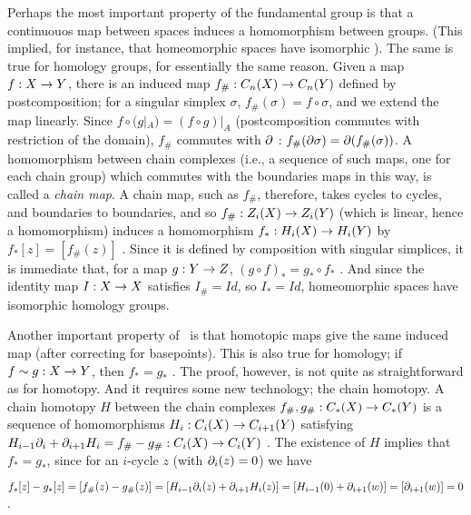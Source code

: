 Perhaps the most important property of the fundamental group is that a continuouos map 
between spaces induces a homomorphism between groups. (This implied, for instance,
that homeomorphic spaces have isomorphic \mpu ). The same is true for homology groups, 
for essentially the same reason. Given a map $f:X\rightarrow Y$, there is an induced map $f_\#:C_n(X)\rightarrow C_n(Y)$
defined by postcomposition; for a singular simplex $\sigma$, $f_\#(\sigma) = f\circ\sigma$, and we extend
the map linearly. Since $f\circ(g|_A) = (f\circ g)|_A$ (postcomposition commutes with restriction of the domain),
$f_\#$ commutes with $\partial$ : $f_\#(\partial \sigma) = \partial(f_\#(\sigma))$. A homomorphism between
chain complexes (i.e., a sequence of such maps, one for each chain group) which commutes with the 
boundaries maps in this way, is called a {\it chain map}.
A chain map, such as $f_\#$, therefore, takes cycles to cycles,
and boundaries to boundaries, and so $f_\#:Z_i(X)\rightarrow Z_i(Y)$ (which is linear, hence a homomorphism)
induces a homomorphism $f_*:H_i(X)\rightarrow H_i(Y)$ by $f_*[z] = [f_\#(z)]$ . 
Since it is defined by composition with singular simplices, it is 
immediate that, for a map $g:Y\rightarrow Z$, $(g\circ f)_*=g_*\circ f_*$ . And since the identity map $I:X\rightarrow X$
satisfies $I_\#=Id$, so $I_*=Id$, homeomorphic spaces have isomorphic homology groups.

\msk

Another important property of \mpu\ is that homotopic maps give the same
induced map (after correcting for basepoints). This is also true for homology;
if $f\sim g:X\rightarrow Y$, then $f_*=g_*$ . The proof, however, is not quite as straightforward
as for homotopy. And it requires some new technology; the chain homotopy.
A chain homotopy $H$ between the chain complexes $f_\#,g_\#:C_*(X)\rightarrow C_*(Y)$ 
is a sequence of homomorphisms $H_i:C_i(X)\rightarrow C_{i+1}(Y)$ satisfying
$H_{i-1}\partial_i+\partial_{i+1}H_i = f_\#-g_\#:C_i(X)\rightarrow C_i(Y)$ . The existence of $H$
implies that $f_*=g_*$, since for an $i$-cycle $z$ (with $\partial_i(z)=0$) we have

$f_*[z]-g_*[z] = [f_\#(z)-g_\#(z)] = [H_{i-1}\partial_i(z)+\partial_{i+1}H_i(z)] = [H_{i-1}(0)+\partial_{i+1}(w)]
=[\partial_{i+1}(w)]=0$.

